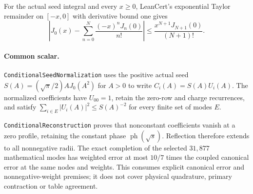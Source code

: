 \documentclass[11pt,a4paper]{article}
\begin{document}
For the actual seed integral and every $x\ge0$, LeanCert's exponential Taylor
remainder on $[-x,0]$ with derivative bound one gives
\[
 \left|J_0(x)-\sum_{n=0}^{N}\frac{(-x)^n J_n(0)}{n!}\right|
 \le \frac{x^{N+1}J_{N+1}(0)}{(N+1)!}.
\]

\paragraph{Common scalar.}
\texttt{ConditionalSeedNormalization} uses the positive actual seed
$S(A)=(\sqrt\pi/2)A J_0(A^2)$ for $A>0$ to write $C_i(A)=S(A)U_i(A)$.
The normalized coefficients have $U_{00}=1$, retain the zero-row and charge
recurrences, and satisfy $\sum_{i\in E}|U_i(A)|^2\le S(A)^{-2}$ for every
finite set of modes $E$.

\texttt{ConditionalReconstruction} proves that nonconstant coefficients vanish
at a zero profile, retaining the constant phase $\operatorname{ph}(\sqrt{s})$.
Reflection therefore extends to all nonnegative radii. The exact completion
of the selected $31{,}877$ mathematical modes has weighted error at most
$10/7$ times the coupled canonical error at the same nodes and weights.
This consumes explicit canonical error and nonnegative-weight premises;
it does not cover physical quadrature, primary contraction or table agreement.
\end{document}

